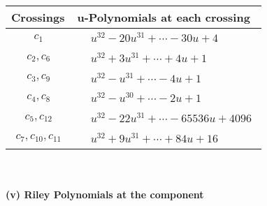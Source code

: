 \documentclass[1p]{elsarticle_modified}
\theoremstyle{definition}
\begin{document}
\begin{tabular}{m{50pt}|m{274pt}}
Crossings & \hspace{64pt}u-Polynomials at each crossing \\
\hline $$\begin{aligned}c_{1}\end{aligned}$$&$\begin{aligned}
&u^{32}-20 u^{31}+\cdots-30 u+4
\end{aligned}$\\
\hline $$\begin{aligned}c_{2},c_{6}\end{aligned}$$&$\begin{aligned}
&u^{32}+3 u^{31}+\cdots+4 u+1
\end{aligned}$\\
\hline $$\begin{aligned}c_{3},c_{9}\end{aligned}$$&$\begin{aligned}
&u^{32}- u^{31}+\cdots-4 u+1
\end{aligned}$\\
\hline $$\begin{aligned}c_{4},c_{8}\end{aligned}$$&$\begin{aligned}
&u^{32}- u^{30}+\cdots-2 u+1
\end{aligned}$\\
\hline $$\begin{aligned}c_{5},c_{12}\end{aligned}$$&$\begin{aligned}
&u^{32}-22 u^{31}+\cdots-65536 u+4096
\end{aligned}$\\
\hline $$\begin{aligned}c_{7},c_{10},c_{11}\end{aligned}$$&$\begin{aligned}
&u^{32}+9 u^{31}+\cdots+84 u+16
\end{aligned}$\\
\hline
\end{tabular}\\~\\
\newpage\renewcommand{\arraystretch}{1}
\flushleft \textbf{(v) Riley Polynomials at the component}\newline \\
\end{document}
